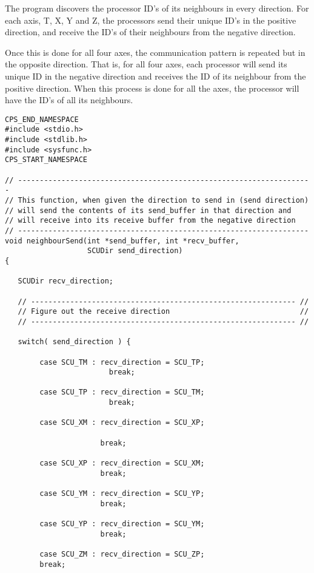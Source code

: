 The program discovers the processor ID's of its neighbours in every direction.
For each axis, T, X, Y and Z, the processors send their unique ID's in the
positive direction, and receive the ID's of their neighbours from the negative
direction.

Once this is done for all four axes, the communication pattern is
repeated but in the opposite direction. That is, for all four axes,
each processor will send its unique ID in the negative direction and
receives the ID of its neighbour from the positive direction.  When
this process is done for all the axes, the processor will have the ID's of
all its neighbours.

{\scriptsize
\begin{verbatim}
CPS_END_NAMESPACE
#include <stdio.h>
#include <stdlib.h>
#include <sysfunc.h>
CPS_START_NAMESPACE

// --------------------------------------------------------------------
// This function, when given the direction to send in (send direction)
// will send the contents of its send_buffer in that direction and 
// will receive into its receive buffer from the negative direction
// -------------------------------------------------------------------
void neighbourSend(int *send_buffer, int *recv_buffer,
                   SCUDir send_direction)
{

   SCUDir recv_direction;

   // ------------------------------------------------------------- //
   // Figure out the receive direction                              //
   // ------------------------------------------------------------- //

   switch( send_direction ) {

        case SCU_TM : recv_direction = SCU_TP;
                        break;

        case SCU_TP : recv_direction = SCU_TM;
                        break;

        case SCU_XM : recv_direction = SCU_XP;

                      break;

        case SCU_XP : recv_direction = SCU_XM;
                      break;

        case SCU_YM : recv_direction = SCU_YP;
                      break;

        case SCU_YP : recv_direction = SCU_YM;
                      break;

        case SCU_ZM : recv_direction = SCU_ZP;
        break;


\end{verbatim}}
